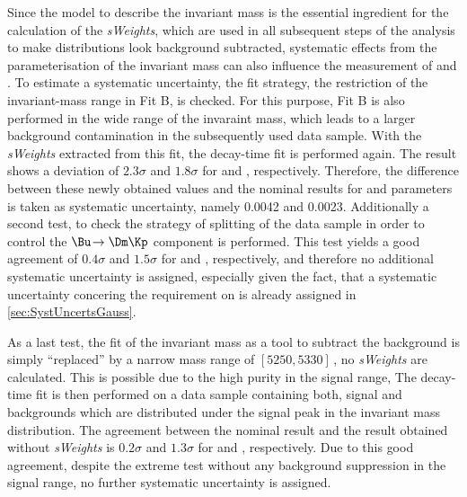 Since the model to describe the invariant mass is the essential ingredient for the calculation of the \emph{sWeights}, which are used in all subsequent steps of the analysis to make distributions look background subtracted, systematic effects from the parameterisation of the invariant mass can also influence the measurement of \Sf and \Sfbar.
To estimate a systematic uncertainty, the fit strategy, \ie the restriction of the invariant-mass range in Fit B, is checked.
For this purpose, Fit B is also performed in the wide range of the invaraint mass, which leads to a larger background contamination in the subsequently used data sample.
With the \emph{sWeights} extracted from this fit, the decay-time fit is performed again.
The result shows a deviation of $2.3\sigma$ and $1.8\sigma$ for \Sf and \Sfbar, respectively.
Therefore, the difference between these newly obtained values and the nominal results for \Sf and \Sfbar parameters is taken as systematic uncertainty, namely \num{0.0042} and \num{0.0023}.
Additionally a second test, to check the strategy of splitting of the data sample in order to control the $\Bu\!\to\Dm\Kp$ component is performed.
This test yields a good agreement of $0.4\sigma$ and $1.5\sigma$ for \Sf and \Sfbar, respectively, and therefore no additional systematic uncertainty is assigned, especially given the fact, that a systematic uncertainty concering the requirement on \dllkpi is already assigned in \cref{sec:SystUncertsGauss}.

As a last test, the fit of the invariant mass as a tool to subtract the background is simply \enquote{replaced} by a narrow mass range of $[5250,5330]\,$\si[per-mode=symbol]{\MeVcc}, \ie no \emph{sWeights} are calculated.
This is possible due to the high purity in the signal range,
The decay-time fit is then performed on a data sample containing both, signal and backgrounds which are distributed under the signal peak in the invariant mass distribution.
The agreement between the nominal result and the result obtained without \emph{sWeights} is $0.2\sigma$ and $1.3\sigma$ for \Sf and \Sfbar, respectively.
Due to this good agreement, despite the extreme test without any background suppression in the signal range, no further systematic uncertainty is assigned.
